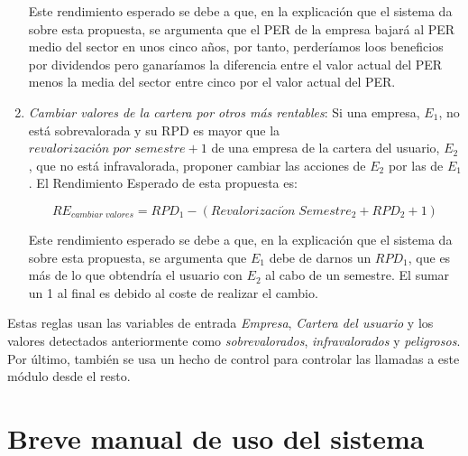 \documentclass[11pt,openany]{book} %
\begin{document}
\begin{enumerate}[\qquad\color{ocre}{$\bullet$}]
    Este rendimiento esperado se debe a que, en la explicación que el sistema da sobre esta propuesta, se argumenta que el PER de la empresa bajará al PER medio del sector en unos cinco años, por tanto, perderíamos loos beneficios por dividendos pero ganaríamos la diferencia entre el valor actual del PER menos la media del sector entre cinco por el valor actual del PER.

    \item \textit{\textcolor{ocre} {Cambiar valores de la cartera por otros más rentables}}: Si una empresa, $E_1$, no está sobrevalorada y su RPD es mayor que la $revalorización\;por\;semestre +1$  de una empresa de la cartera del usuario, $E_2$, que no está infravalorada, proponer cambiar las acciones de $E_2$ por las de $E_1$. El Rendimiento Esperado de esta propuesta es:

    \begin{theorem}
        \begin{displaymath}
            RE_{cambiar\;valores} = RPD_1 - (Revalorizaci\acute{o}n\;Semestre_2 + RPD_2 + 1)
        \end{displaymath}
    \end{theorem}

    Este rendimiento esperado se debe a que, en la explicación que el sistema da sobre esta propuesta, se argumenta que $E_1$ debe de darnos un $RPD_1$, que es más de lo que obtendría el usuario con $E_2$ al cabo de un semestre. El sumar un 1 al final es debido al coste de realizar el cambio.
\end{enumerate}

Estas reglas usan las variables de entrada \textit{\textcolor{ocre}{Empresa}}, \textit{\textcolor{ocre}{Cartera del usuario}} y los valores detectados anteriormente como \textit{\textcolor{ocre}{sobrevalorados}}, \textit{\textcolor{ocre}{infravalorados}} y \textit{\textcolor{ocre}{peligrosos}}. Por último, también se usa un hecho de control para controlar las llamadas a este módulo desde el resto.


\chapter{Breve manual de uso del sistema}
\end{document}
